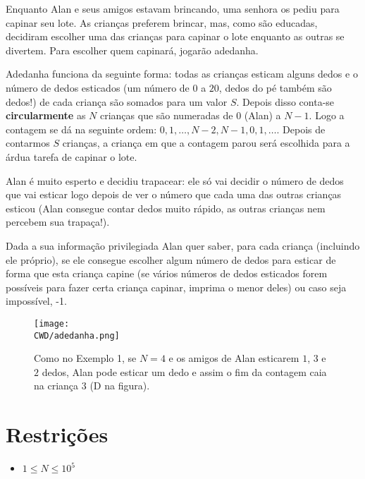 Enquanto Alan e seus amigos estavam brincando, uma senhora os pediu para capinar seu lote. As crianças preferem brincar, mas, como são educadas, decidiram escolher uma das crianças para capinar o lote enquanto as outras se divertem. Para escolher quem capinará, jogarão adedanha.

Adedanha funciona da seguinte forma: todas as crianças esticam alguns dedos e o número de dedos esticados (um número de $0$ a $20$, dedos do pé também são dedos!) de cada criança são somados para um valor $S$. Depois disso conta-se \textbf{circularmente} as $N$ crianças que são numeradas de $0$ (Alan) a $N - 1$. Logo a contagem se dá na seguinte ordem: $0, 1, \ldots, N - 2, N - 1, 0, 1, \ldots$. Depois de contarmos $S$ crianças, a criança em que a contagem parou será escolhida para a árdua tarefa de capinar o lote.

Alan é muito esperto e decidiu trapacear: ele só vai decidir o número de dedos que vai esticar logo depois de ver o número que cada uma das outras crianças esticou (Alan consegue contar dedos muito rápido, as outras crianças nem percebem sua trapaça!).

Dada a sua informação privilegiada Alan quer saber, para cada criança (incluindo ele próprio), se ele consegue escolher algum número de dedos para esticar de forma que esta criança capine (se vários números de dedos esticados forem possíveis para fazer certa criança capinar, imprima o menor deles) ou caso seja impossível, -1.

\begin{figure}[H]
    \centering
    \texttt{[image: \\CWD/adedanha.png]}
    \caption{Como no Exemplo 1, se $N = 4$ e os amigos de Alan esticarem $1$, $3$ e $2$ dedos, Alan pode esticar um dedo e assim o fim da contagem caia na criança $3$ (D na figura).}
\end{figure}



\section*{Restrições}

\begin{itemize}
\item $1 \leq N \leq 10^5$
\end{itemize}

\sampleio